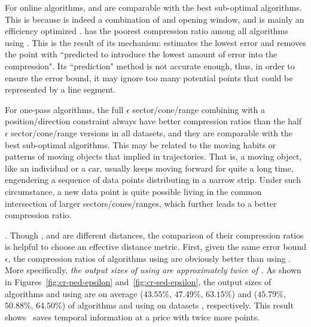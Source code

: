 For online algorithms, \bqsa and \opwa are comparable with the best sub-optimal algorithms. This is because \opwa is indeed a combination of \dpa and opening window, and \bqsa is mainly an efficiency optimized \opwa.
\squishe has the poorest compression ratio among all algorithms using \sed. This is the result of its mechanism: \squishe estimates the lowest \sed error and removes the point with ``predicted to introduce the lowest amount of error into the compression"\cite{Muckell:SQUISH}. Its ``prediction" method is not accurate enough, thus, in order to ensure the error bound, it may ignore too many potential points that could be represented by a line segment.

For one-pass algorithms, the full $\epsilon$ sector/cone/range combining with a position/direction constraint always have better compression ratios than the half $\epsilon$ sector/cone/range versions in all datasets, and they are comparable with the best sub-optimal algorithms.
This may be related to the moving habits or patterns of moving objects that implied in trajectories.
That is, a moving object, like an individual or a car, usually keeps moving forward for quite a long time, engendering a sequence of data points distributing in a narrow strip. Under such circumstance, a new data point is quite possible living in the common intersection of larger sectors/cones/ranges, which further leads to a better compression ratio.



.
Though \ped, \sed and \dad are different distances, the comparison of their compression ratios is helpful to choose an effective distance metric.
%
First, given the same error bound $\epsilon$, the compression ratios of algorithms using \ped are obviously better
than using \sed. More specifically, \emph{the output sizes of using \sed are approximately twice of \ped.}
%
As shown in Figures~\ref{fig:cr-ped-epsilon} and~\ref{fig:cr-sed-epsilon}, the output sizes of algorithms \tpa and \dpa
using \ped are on average ($43.55\%$, $47.49\%$, $63.15\%$) and ($45.79\%$,
$50.88\%$, $64.50\%$) of algorithms \tpa and \dpa using \sed on datasets \dSets, respectively.
%
%
This result shows ~\sed saves temporal information at a price with twice more points.


